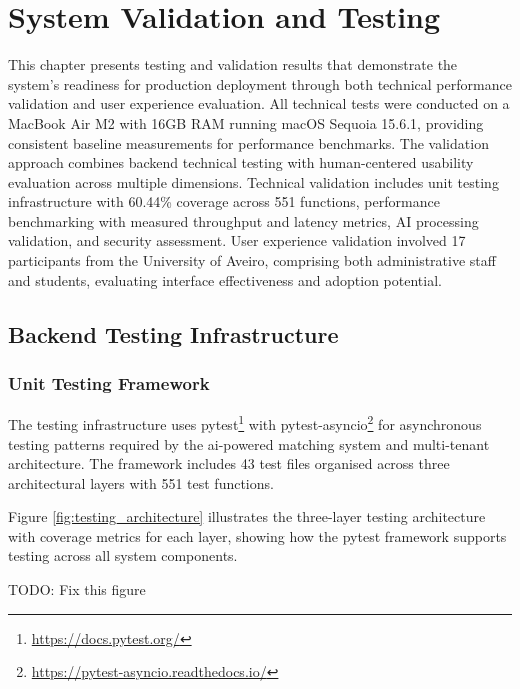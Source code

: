 \chapter{System Validation and Testing}
\label{chapter:testing_validation}

This chapter presents testing and validation results that demonstrate the system's readiness for production deployment through both technical performance validation and user experience evaluation. All technical tests were conducted on a MacBook Air M2 with 16GB RAM running macOS Sequoia 15.6.1, providing consistent baseline measurements for performance benchmarks. The validation approach combines backend technical testing with human-centered usability evaluation across multiple dimensions. Technical validation includes unit testing infrastructure with 60.44\% coverage across 551 functions, performance benchmarking with measured throughput and latency metrics, AI processing validation, and security assessment. User experience validation involved 17 participants from the University of Aveiro, comprising both administrative staff and students, evaluating interface effectiveness and adoption potential.


\section{Backend Testing Infrastructure} \label{section:backend_testing}

\subsection{Unit Testing Framework} \label{subsection:unit_testing_framework}

The testing infrastructure uses pytest\footnote{\url{https://docs.pytest.org/}} with pytest-asyncio\footnote{\url{https://pytest-asyncio.readthedocs.io/}} for asynchronous testing patterns required by the \ac{ai}-powered matching system and multi-tenant architecture. The framework includes 43 test files organised across three architectural layers with 551 test functions.

Figure \ref{fig:testing_architecture} illustrates the three-layer testing architecture with coverage metrics for each layer, showing how the pytest framework supports testing across all system components.

TODO: Fix this figure 

